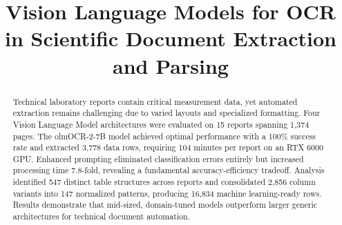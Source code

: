 \documentclass[conference]{IEEEtran}
\begin{document}
\title{Vision Language Models for OCR in Scientific Document Extraction and Parsing}

\author{
\and
{}
\and
{}
\and
{}
}

\maketitle

\begin{abstract}
Technical laboratory reports contain critical measurement data, yet automated extraction remains challenging due to varied layouts and specialized formatting. Four Vision Language Model architectures were evaluated on 15 reports spanning 1,374 pages. The olmOCR-2-7B model achieved optimal performance with a 100\% success rate and extracted 3,778 data rows, requiring 104 minutes per report on an RTX 6000 GPU. Enhanced prompting eliminated classification errors entirely but increased processing time 7.8-fold, revealing a fundamental accuracy-efficiency tradeoff. Analysis identified 547 distinct table structures across reports and consolidated 2,856 column variants into 147 normalized patterns, producing 16,834 machine learning-ready rows. Results demonstrate that mid-sized, domain-tuned models outperform larger generic architectures for technical document automation.
\end{abstract}
\end{document}
